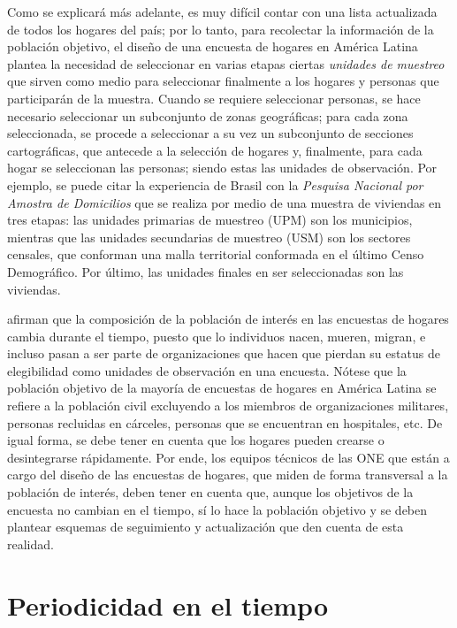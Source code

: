 \documentclass[
  10pt,
  spanish,
]{book}
\begin{document}
Como se explicará más adelante, es muy difícil contar con una lista actualizada de todos los hogares del país; por lo tanto, para recolectar la información de la población objetivo, el diseño de una encuesta de hogares en América Latina plantea la necesidad de seleccionar en varias etapas ciertas \emph{unidades de muestreo} que sirven como medio para seleccionar finalmente a los hogares y personas que participarán de la muestra. Cuando se requiere seleccionar personas, se hace necesario seleccionar un subconjunto de zonas geográficas; para cada zona seleccionada, se procede a seleccionar a su vez un subconjunto de secciones cartográficas, que antecede a la selección de hogares y, finalmente, para cada hogar se seleccionan las personas; siendo estas las unidades de observación. Por ejemplo, se puede citar la experiencia de Brasil con la \emph{Pesquisa Nacional por Amostra de Domicilios} que se realiza por medio de una muestra de viviendas en tres etapas: las unidades primarias de muestreo (UPM) son los municipios, mientras que las unidades secundarias de muestreo (USM) son los sectores censales, que conforman una malla territorial conformada en el último Censo Demográfico. Por último, las unidades finales en ser seleccionadas son las viviendas.

\citet[ , pág. 105]{Duncan_Kalton_1987} afirman que la composición de la población de interés en las encuestas de hogares cambia durante el tiempo, puesto que lo individuos nacen, mueren, migran, e incluso pasan a ser parte de organizaciones que hacen que pierdan su estatus de elegibilidad como unidades de observación en una encuesta. Nótese que la población objetivo de la mayoría de encuestas de hogares en América Latina se refiere a la población civil excluyendo a los miembros de organizaciones militares, personas recluidas en cárceles, personas que se encuentran en hospitales, etc. De igual forma, se debe tener en cuenta que los hogares pueden crearse o desintegrarse rápidamente. Por ende, los equipos técnicos de las ONE que están a cargo del diseño de las encuestas de hogares, que miden de forma transversal a la población de interés, deben tener en cuenta que, aunque los objetivos de la encuesta no cambian en el tiempo, sí lo hace la población objetivo y se deben plantear esquemas de seguimiento y actualización que den cuenta de esta realidad.

\hypertarget{periodicidad-en-el-tiempo}{%
\section{Periodicidad en el tiempo}\label{periodicidad-en-el-tiempo}}
\end{document}
